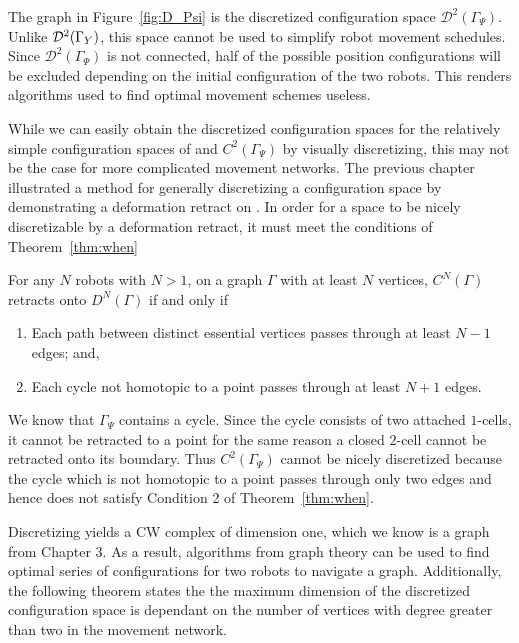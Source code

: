 The graph in Figure~\ref{fig:D_Psi} is the discretized configuration space $\mathcal{D}^2(\Gamma_{\Psi})$. Unlike $\mathcal{D}^2(\Gamma_Y)$, this space cannot be used to simplify robot movement schedules. Since $\mathcal{D}^2(\Gamma_{\Psi})$ is not connected, half of the possible position configurations will be excluded depending on the initial configuration of the two robots. This renders algorithms used to find optimal movement schemes useless. 

While we can easily obtain the discretized configuration spaces for the relatively simple configuration spaces of \C and $C^2(\Gamma_{\Psi})$ by visually discretizing, this may not be the case for more complicated movement networks. The previous chapter illustrated a method for generally discretizing a configuration space by demonstrating a deformation retract on \C. In order for a space to be nicely discretizable by a deformation retract, it must meet the conditions of Theorem~\ref{thm:when}

\begin{thm}\label{thm:when}
For any $N$ robots with $N>1$, on a graph $\Gamma$ with at least $N$ vertices, $C^N(\Gamma)$ retracts onto $D^N(\Gamma)$ if and only if 

\begin{enumerate}
\item Each path between distinct essential vertices passes through at least $N-1$ edges; and,
\item Each cycle not homotopic to a point passes through at least $N+1$ edges.\cite{factory}
\end{enumerate}
\end{thm}

We know that $\Gamma_{\Psi}$ contains a cycle. Since the cycle consists of two attached $1$-cells, it cannot be retracted to a point for the same reason a closed $2$-cell cannot be retracted onto its boundary. Thus $C^2(\Gamma_{\Psi})$ cannot be nicely discretized because the cycle which is not homotopic to a point passes through only two edges and hence does not satisfy Condition 2 of Theorem~\ref{thm:when}.

Discretizing \C  yields a CW complex of dimension one, which we know is a graph from Chapter 3. As a result, algorithms from graph theory can be used to find optimal series of configurations for two robots to navigate a graph. Additionally, the following theorem states the the maximum dimension of the discretized configuration space is dependant on the number of vertices with degree greater than two in the movement network.

